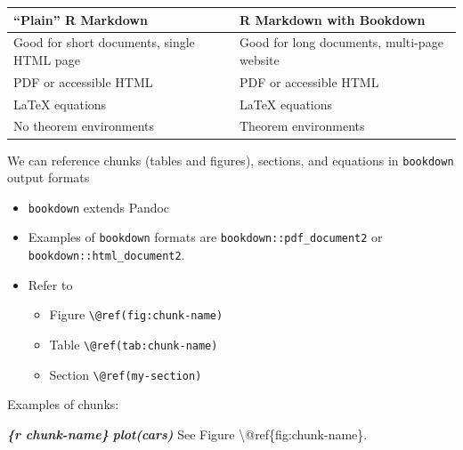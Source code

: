 \documentclass[
]{book}
\newenvironment{Shaded}{\begin{snugshade}}{\end{snugshade}}
\newcommand{\InformationTok}[1]{\textcolor[rgb]{0.56,0.35,0.01}{\textbf{\textit{#1}}}}
\newcommand{\NormalTok}[1]{#1}
\providecommand{\tightlist}{%
  \setlength{\itemsep}{0pt}\setlength{\parskip}{0pt}}
\theoremstyle{definition}
\theoremstyle{definition}
\theoremstyle{definition}
\theoremstyle{definition}
\theoremstyle{remark}
\begin{document}
\begin{longtable}[]{@{}
  >{\raggedright\arraybackslash}p{}
  >{\raggedright\arraybackslash}p{}@{}}
\toprule\noalign{}
\begin{minipage}[b]{\linewidth}\raggedright
``Plain'' R Markdown
\end{minipage} & \begin{minipage}[b]{\linewidth}\raggedright
R Markdown with Bookdown
\end{minipage} \\
\midrule\noalign{}
\endhead
\bottomrule\noalign{}
\endlastfoot
Good for short documents, single HTML page & Good for long documents, multi-page website \\
PDF or accessible HTML & PDF or accessible HTML \\
LaTeX equations & LaTeX equations \\
No theorem environments & Theorem environments \\
\end{longtable}

We can reference chunks (tables and figures), sections, and equations in \texttt{bookdown} output formats

\begin{itemize}
\tightlist
\item
  \texttt{bookdown} extends Pandoc
\item
  Examples of \texttt{bookdown} formats are \texttt{bookdown::pdf\_document2} or \texttt{bookdown::html\_document2}.
\item
  Refer to

  \begin{itemize}
  \tightlist
  \item
    Figure \texttt{\textbackslash{}@ref(fig:chunk-name)}
  \item
    Table \texttt{\textbackslash{}@ref(tab:chunk-name)}
  \item
    Section \texttt{\textbackslash{}@ref(my-section)}
  \end{itemize}
\end{itemize}

Examples of chunks:

\begin{Shaded}
\begin{Highlighting}[]
\InformationTok{\textasciigrave{}\textasciigrave{}\textasciigrave{}\{r chunk{-}name\}}
\InformationTok{plot(cars)}
\InformationTok{\textasciigrave{}\textasciigrave{}\textasciigrave{}} 
\NormalTok{See Figure \textbackslash{}@ref\{fig:chunk{-}name\}.}
\end{Highlighting}
\end{Shaded}
\end{document}
